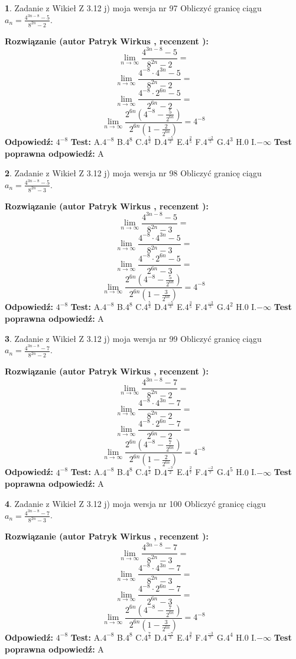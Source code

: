 \documentclass[12pt, a4paper]{article}
\theoremstyle{definition} %
\newtheorem{zad}{}
\newcommand{\zadStart}[1]{\begin{zad}#1\newline}
\newcommand{\zadStop}{\end{zad}}
\newcommand{\rozwStart}[2]{\noindent \textbf{Rozwiązanie (autor #1 , recenzent #2): }\newline}
\newcommand{\rozwStop}{\newline}
\newcommand{\odpStart}{\noindent \textbf{Odpowiedź:}\newline}
\newcommand{\odpStop}{\newline}
\newcommand{\testStart}{\noindent \textbf{Test:}\newline}
\newcommand{\testStop}{\newline}
\newcommand{\kluczStart}{\noindent \textbf{Test poprawna odpowiedź:}\newline}
\newcommand{\kluczStop}{\newline}
\begin{document}
\zadStart{Zadanie z Wikieł Z 3.12 j) moja wersja nr 97}
Obliczyć granicę ciągu $a_{n}=\frac{4^{3n-8}-5}{8^{2n}-2}$.
\zadStop
\rozwStart{Patryk Wirkus}{}
$$\lim\limits_{n\to\infty}\frac{4^{3n-8}-5}{8^{2n}-2}=$$
$$\lim\limits_{n\to\infty}\frac{4^{-8} \cdot 4^{3n}-5}{8^{2n}-2}=$$
$$\lim\limits_{n\to\infty}\frac{4^{-8} \cdot 2^{6n}-5}{2^{6n}-2}=$$
$$\lim\limits_{n\to\infty}\frac{2^{6n}(4^{-8} - \frac{5}{2^{6n}})}{2^{6n}(1-\frac{2}{2^{6n}})}= 4^{-8}$$
\rozwStop
\odpStart
$4^{-8}$
\odpStop
\testStart
A.$4^{-8}$
B.$4^{8}$
C.$4^{\frac{5}{2}}$
D.$4^{\frac{-5}{2}}$
E.$4^{\frac{2}{5}}$
F.$4^{\frac{-2}{5}}$
G.$4^{3}$
H.$0$
I.$-\infty$
\testStop
\kluczStart
A
\kluczStop



\zadStart{Zadanie z Wikieł Z 3.12 j) moja wersja nr 98}
Obliczyć granicę ciągu $a_{n}=\frac{4^{3n-8}-5}{8^{2n}-3}$.
\zadStop
\rozwStart{Patryk Wirkus}{}
$$\lim\limits_{n\to\infty}\frac{4^{3n-8}-5}{8^{2n}-3}=$$
$$\lim\limits_{n\to\infty}\frac{4^{-8} \cdot 4^{3n}-5}{8^{2n}-3}=$$
$$\lim\limits_{n\to\infty}\frac{4^{-8} \cdot 2^{6n}-5}{2^{6n}-3}=$$
$$\lim\limits_{n\to\infty}\frac{2^{6n}(4^{-8} - \frac{5}{2^{6n}})}{2^{6n}(1-\frac{3}{2^{6n}})}= 4^{-8}$$
\rozwStop
\odpStart
$4^{-8}$
\odpStop
\testStart
A.$4^{-8}$
B.$4^{8}$
C.$4^{\frac{5}{3}}$
D.$4^{\frac{-5}{3}}$
E.$4^{\frac{3}{5}}$
F.$4^{\frac{-3}{5}}$
G.$4^{2}$
H.$0$
I.$-\infty$
\testStop
\kluczStart
A
\kluczStop



\zadStart{Zadanie z Wikieł Z 3.12 j) moja wersja nr 99}
Obliczyć granicę ciągu $a_{n}=\frac{4^{3n-8}-7}{8^{2n}-2}$.
\zadStop
\rozwStart{Patryk Wirkus}{}
$$\lim\limits_{n\to\infty}\frac{4^{3n-8}-7}{8^{2n}-2}=$$
$$\lim\limits_{n\to\infty}\frac{4^{-8} \cdot 4^{3n}-7}{8^{2n}-2}=$$
$$\lim\limits_{n\to\infty}\frac{4^{-8} \cdot 2^{6n}-7}{2^{6n}-2}=$$
$$\lim\limits_{n\to\infty}\frac{2^{6n}(4^{-8} - \frac{7}{2^{6n}})}{2^{6n}(1-\frac{2}{2^{6n}})}= 4^{-8}$$
\rozwStop
\odpStart
$4^{-8}$
\odpStop
\testStart
A.$4^{-8}$
B.$4^{8}$
C.$4^{\frac{7}{2}}$
D.$4^{\frac{-7}{2}}$
E.$4^{\frac{2}{7}}$
F.$4^{\frac{-2}{7}}$
G.$4^{5}$
H.$0$
I.$-\infty$
\testStop
\kluczStart
A
\kluczStop



\zadStart{Zadanie z Wikieł Z 3.12 j) moja wersja nr 100}
Obliczyć granicę ciągu $a_{n}=\frac{4^{3n-8}-7}{8^{2n}-3}$.
\zadStop
\rozwStart{Patryk Wirkus}{}
$$\lim\limits_{n\to\infty}\frac{4^{3n-8}-7}{8^{2n}-3}=$$
$$\lim\limits_{n\to\infty}\frac{4^{-8} \cdot 4^{3n}-7}{8^{2n}-3}=$$
$$\lim\limits_{n\to\infty}\frac{4^{-8} \cdot 2^{6n}-7}{2^{6n}-3}=$$
$$\lim\limits_{n\to\infty}\frac{2^{6n}(4^{-8} - \frac{7}{2^{6n}})}{2^{6n}(1-\frac{3}{2^{6n}})}= 4^{-8}$$
\rozwStop
\odpStart
$4^{-8}$
\odpStop
\testStart
A.$4^{-8}$
B.$4^{8}$
C.$4^{\frac{7}{3}}$
D.$4^{\frac{-7}{3}}$
E.$4^{\frac{3}{7}}$
F.$4^{\frac{-3}{7}}$
G.$4^{4}$
H.$0$
I.$-\infty$
\testStop
\kluczStart
A
\kluczStop
\end{document}

